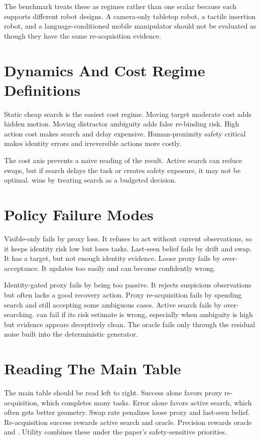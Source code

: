 The benchmark treats these as regimes rather than one scalar because each supports different robot designs. A camera-only tabletop robot, a tactile insertion robot, and a language-conditioned mobile manipulator should not be evaluated as though they have the same re-acquisition evidence.

\section{Dynamics And Cost Regime Definitions}

Static cheap search is the easiest cost regime. Moving target moderate cost adds hidden motion. Moving distractor ambiguity adds false re-binding risk. High action cost makes search and delay expensive. Human-proximity safety critical makes identity errors and irreversible actions more costly.

The cost axis prevents a naive reading of the result. Active search can reduce swaps, but if search delays the task or creates safety exposure, it may not be optimal. \method wins by treating search as a budgeted decision.

\section{Policy Failure Modes}

Visible-only fails by proxy loss. It refuses to act without current observations, so it keeps identity risk low but loses tasks. Last-seen belief fails by drift and swap. It has a target, but not enough identity evidence. Loose proxy fails by over-acceptance. It updates too easily and can become confidently wrong.

Identity-gated proxy fails by being too passive. It rejects suspicious observations but often lacks a good recovery action. Proxy re-acquisition fails by spending search and still accepting some ambiguous cases. Active search fails by over-searching. \method can fail if its risk estimate is wrong, especially when ambiguity is high but evidence appears deceptively clean. The oracle fails only through the residual noise built into the deterministic generator.

\section{Reading The Main Table}

The main table should be read left to right. Success alone favors proxy re-acquisition, which completes many tasks. Error alone favors active search, which often gets better geometry. Swap rate penalizes loose proxy and last-seen belief. Re-acquisition success rewards active search and oracle. Precision rewards oracle and \method. Utility combines these under the paper's safety-sensitive priorities.

